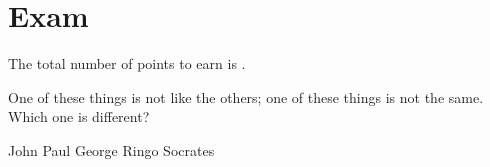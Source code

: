 \documentclass[a4paper,answers,addpoints]{exam}
\begin{document}
\section*{Exam}
The total number of points to earn is \numpoints.

\hrulefill


\begin{questions}

\question[5]
One of these things is not like the others; one of these
things is not the same. Which one is different?

\begin{randomizechoices}
\choice John
\choice Paul
\choice George
\choice Ringo
\CorrectChoice Socrates
\end{randomizechoices}



\end{questions}
\end{document}
